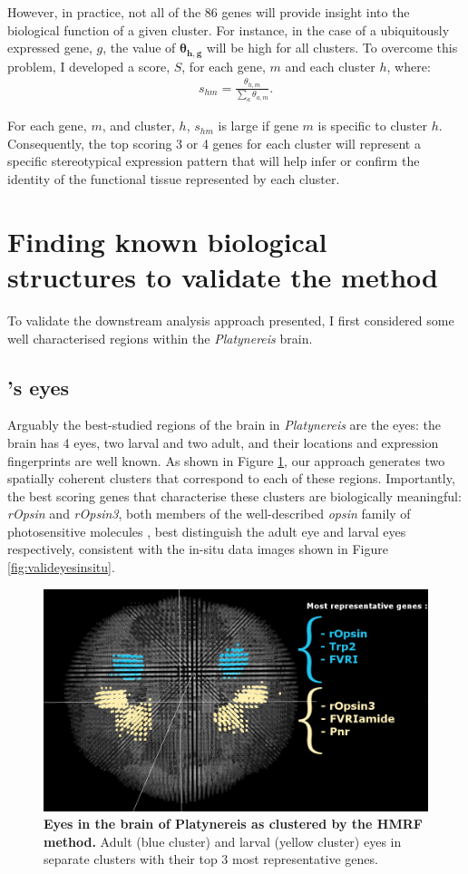 	However, in practice, not all of the 86 genes will provide insight into the biological function of a given cluster. For instance, in the case of a ubiquitously expressed gene, $g$, the value of $\boldsymbol{\theta_{h,g}}$ will be high for all clusters. To overcome this problem, I developed a score, $S$, for each gene, $m$ and each cluster $h$, where:
\begin{align*}
s_{hm} = \frac{\theta_{h,m}}{\sum_{a} \theta_{a,m}}.
\end{align*}

For each gene, $m$, and cluster, $h$, $s_{hm}$ is large if gene $m$ is specific to cluster $h$. Consequently, the top scoring 3 or 4 genes for each cluster will represent a specific stereotypical expression pattern that will help infer or confirm the identity of the functional tissue represented by each cluster.

	\section{Finding known biological structures to validate the method}
	To validate the downstream analysis approach presented, I first considered some well characterised regions within the {\it{Platynereis}} brain.
		\subsection{\platy{}'s eyes}
		Arguably the best-studied regions of the brain in {\it{Platynereis}} are the eyes: the brain has 4 eyes, two larval and two adult, and their locations and expression fingerprints are well known. As shown in Figure \ref{fig:valideyesclust}, our approach generates two spatially coherent clusters that correspond to each of these regions. Importantly, the best scoring genes that characterise these clusters are biologically meaningful: {\it{rOpsin}} and {\it{rOpsin3}}, both members of the well-described \emph{opsin} family of photosensitive molecules \citep{terakita05,randel13}, best distinguish the adult eye and larval eyes respectively, consistent with the in-situ data images shown in Figure \ref{fig:valideyesinsitu}.
	\begin{figure}[H]
\centerline{\includegraphics[width=1\linewidth]{gfx/chapter6/eyes.png}}
\caption{{\bf Eyes in the brain of Platynereis as clustered by the HMRF method.} Adult (blue cluster) and larval (yellow cluster) eyes in separate clusters with their top 3 most representative genes.}
\label{fig:valideyesclust}
	\end{figure}
	
